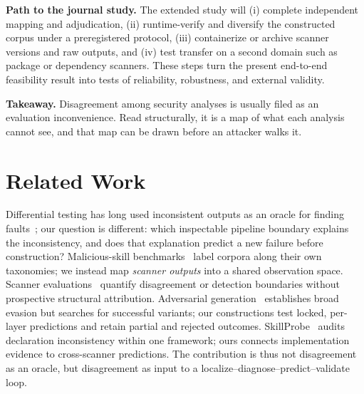 \documentclass[sigconf,nonacm]{acmart}
\begin{document}
\noindent\textbf{Path to the journal study.} The extended study will (i) complete independent mapping and adjudication, (ii) runtime-verify and diversify the constructed corpus under a preregistered protocol, (iii) containerize or archive scanner versions and raw outputs, and (iv) test transfer on a second domain such as package or dependency scanners. These steps turn the present end-to-end feasibility result into tests of reliability, robustness, and external validity.

\noindent\textbf{Takeaway.} Disagreement among security analyses is usually filed as an evaluation inconvenience. Read structurally, it is a map of what each analysis cannot see, and that map can be drawn before an attacker walks it.

\section{Related Work}
\label{sec:related}

Differential testing has long used inconsistent outputs as an oracle for finding faults~\cite{mckeeman1998}; our question is different: which inspectable pipeline boundary explains the inconsistency, and does that explanation predict a new failure before construction? Malicious-skill benchmarks~\cite{malskillbench2026,skilltrustbench2026} label corpora along their own taxonomies; we instead map \emph{scanner outputs} into a shared observation space. Scanner evaluations~\cite{clawhub2026,locatejudge2026,skillscan2026,skillsmetric2026} quantify disagreement or detection boundaries without prospective structural attribution. Adversarial generation~\cite{cloakdetonate2026,colluskill2026} establishes broad evasion but searches for successful variants; our constructions test locked, per-layer predictions and retain partial and rejected outcomes. SkillProbe~\cite{skillprobe2026} audits declaration inconsistency within one framework; ours connects implementation evidence to cross-scanner predictions. The contribution is thus not disagreement as an oracle, but disagreement as input to a localize--diagnose--predict--validate loop.



\end{document}
